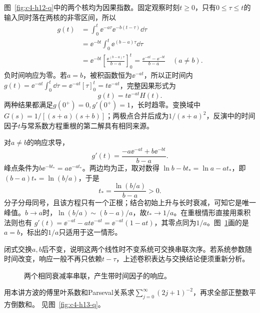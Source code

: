 \begin{solution}
图~\ref{fig:c4-h12-q}中的两个核均为因果指数。固定观察时刻$t\ge0$，只有$0\le\tau\le t$的输入同时落在两核的非零区间，所以
\[\begin{aligned}
g(t)&=\int_0^t\ee^{-a\tau}\ee^{-b(t-\tau)}\dd\tau\\
&=\ee^{-bt}\int_0^t\ee^{(b-a)\tau}\dd\tau\\
&=\ee^{-bt}\left[\frac{\ee^{(b-a)\tau}}{b-a}\right]_0^t
=\boxed{\frac{\ee^{-at}-\ee^{-bt}}{b-a}}\quad(a\ne b).
\end{aligned}\]
负时间响应为零。若$a=b$，被积函数恒为$\ee^{-at}$，所以正时间内
$g(t)=\ee^{-at}\int_0^t\dd\tau=\ee^{-at}[\tau]_0^t=t\ee^{-at}$，完整因果形式为
\[\boxed{g(t)=t\ee^{-at}H(t)}.\]
两种结果都满足$g(0^+)=0,g'(0^+)=1$，长时趋零。变换域中$G(s)=1/[(s+a)(s+b)]$；两极点合并后成为$1/(s+a)^2$，反演中的时间因子$t$与常系数方程重根的第二解具有相同来源。

对$a\ne b$的响应求导，
\[g'(t)=\frac{-a\ee^{-at}+b\ee^{-bt}}{b-a}.\]
峰点条件为$b\ee^{-bt_*}=a\ee^{-at_*}$。两边均为正，取对数得
$\ln b-bt_*=\ln a-at_*$，即$(b-a)t_*=\ln(b/a)$，于是
\[\boxed{t_* =\frac{\ln(b/a)}{b-a}>0}.\]
分子分母同号，且该方程只有一个正根；结合初始上升与长时衰减，可知它是唯一峰值。$b\to a$时，$\ln(b/a)\sim(b-a)/a$，故$t_*\to1/a$。在重根情形直接用乘积法则也有
$g'(t)=\ee^{-at}-at\ee^{-at}=\ee^{-at}(1-at)$，其零点同为$1/a$。图~\ref{fig:c4-h12-s}画的是$a=b$，标出的$1/a$只适用于这一情形。

闭式交换$a,b$后不变，说明这两个线性时不变系统可交换串联次序。若系统参数随时间改变，响应一般不再只依赖$t-\tau$，上述卷积表达与交换结论便须重新分析。

\begin{figure}[H]\centering
{}
\caption{两个相同衰减率串联，产生带时间因子的响应。}\label{fig:c4-h12-s}
\end{figure}
\end{solution}

\begin{exercise}[方波系数的均方和]\label{ex:c4-h13}
用本讲方波的傅里叶系数和Parseval关系求$\sum_{j=0}^\infty(2j+1)^{-2}$，再求全部正整数平方倒数和。 见图~\ref{fig:c4-h13-q}。
\end{exercise}

